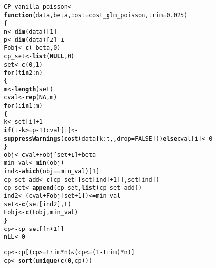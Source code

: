 \documentclass[article]{jss}\usepackage[]{graphicx}\usepackage[]{xcolor}
\makeatletter
\newcommand{\hlnum}[1]{\textcolor[rgb]{0.686,0.059,0.569}{#1}}%
\newcommand{\hlopt}[1]{\textcolor[rgb]{0,0,0}{#1}}%
\newcommand{\hlstd}[1]{\textcolor[rgb]{0.345,0.345,0.345}{#1}}%
\newcommand{\hlkwa}[1]{\textcolor[rgb]{0.161,0.373,0.58}{\textbf{#1}}}%
\newcommand{\hlkwb}[1]{\textcolor[rgb]{0.69,0.353,0.396}{#1}}%
\newcommand{\hlkwc}[1]{\textcolor[rgb]{0.333,0.667,0.333}{#1}}%
\newcommand{\hlkwd}[1]{\textcolor[rgb]{0.737,0.353,0.396}{\textbf{#1}}}%
\newenvironment{kframe}{%
 \def\at@end@of@kframe{}%
 \ifinner\ifhmode%
  \def\at@end@of@kframe{\end{minipage}}%
  \begin{minipage}{\columnwidth}%
 \fi\fi%
 \def\FrameCommand##1{\hskip\@totalleftmargin \hskip-\fboxsep
 \colorbox{shadecolor}{##1}\hskip-\fboxsep
     \hskip-\linewidth \hskip-\@totalleftmargin \hskip\columnwidth}%
 \MakeFramed {\advance\hsize-\width
   \@totalleftmargin\z@ \linewidth\hsize
   \@setminipage}}%
 {\par\unskip\endMakeFramed%
 \at@end@of@kframe}
\newenvironment{knitrout}{}{} %
\makeatother
\begin{document}
\begin{knitrout}
\begin{kframe}
\begin{alltt}
\hlstd{CP_vanilla_poisson} \hlkwb{<-} \hlkwa{function}\hlstd{(}\hlkwc{data}\hlstd{,} \hlkwc{beta}\hlstd{,} \hlkwc{cost}\hlstd{=cost_glm_poisson,} \hlkwc{trim} \hlstd{=} \hlnum{0.025}\hlstd{)}
\hlstd{\{}
\hlstd{n} \hlkwb{<-} \hlkwd{dim}\hlstd{(data)[}\hlnum{1}\hlstd{]}
\hlstd{p} \hlkwb{<-} \hlkwd{dim}\hlstd{(data)[}\hlnum{2}\hlstd{]} \hlopt{-} \hlnum{1}
\hlstd{Fobj} \hlkwb{<-} \hlkwd{c}\hlstd{(}\hlopt{-}\hlstd{beta,} \hlnum{0}\hlstd{)}
\hlstd{cp_set} \hlkwb{<-} \hlkwd{list}\hlstd{(}\hlkwa{NULL}\hlstd{,}\hlnum{0}\hlstd{)}
\hlstd{set} \hlkwb{<-} \hlkwd{c}\hlstd{(}\hlnum{0}\hlstd{,}\hlnum{1}\hlstd{)}
 \hlkwa{for}\hlstd{(t} \hlkwa{in} \hlnum{2}\hlopt{:}\hlstd{n)}
 \hlstd{\{}
 \hlstd{m} \hlkwb{<-} \hlkwd{length}\hlstd{(set)}
 \hlstd{cval} \hlkwb{<-} \hlkwd{rep}\hlstd{(}\hlnum{NA}\hlstd{, m)}
  \hlkwa{for}\hlstd{(i} \hlkwa{in} \hlnum{1}\hlopt{:}\hlstd{m)}
  \hlstd{\{}
  \hlstd{k} \hlkwb{<-} \hlstd{set[i]} \hlopt{+} \hlnum{1}
  \hlkwa{if}\hlstd{(t}\hlopt{-}\hlstd{k}\hlopt{>=}\hlstd{p}\hlopt{-}\hlnum{1}\hlstd{) cval[i]} \hlkwb{<-} \hlkwd{suppressWarnings}\hlstd{(}\hlkwd{cost}\hlstd{(data[k}\hlopt{:}\hlstd{t,,} \hlkwc{drop} \hlstd{=} \hlnum{FALSE}\hlstd{]))} \hlkwa{else} \hlstd{cval[i]} \hlkwb{<-} \hlnum{0}
  \hlstd{\}}
 \hlstd{obj} \hlkwb{<-} \hlstd{cval} \hlopt{+} \hlstd{Fobj[set}\hlopt{+}\hlnum{1}\hlstd{]} \hlopt{+} \hlstd{beta}
 \hlstd{min_val} \hlkwb{<-} \hlkwd{min}\hlstd{(obj)}
 \hlstd{ind} \hlkwb{<-} \hlkwd{which}\hlstd{(obj}\hlopt{==}\hlstd{min_val)[}\hlnum{1}\hlstd{]}
 \hlstd{cp_set_add} \hlkwb{<-} \hlkwd{c}\hlstd{(cp_set[[set[ind]}\hlopt{+}\hlnum{1}\hlstd{]], set[ind])}
 \hlstd{cp_set} \hlkwb{<-} \hlkwd{append}\hlstd{(cp_set,}\hlkwd{list}\hlstd{(cp_set_add))}
 \hlstd{ind2} \hlkwb{<-} \hlstd{(cval} \hlopt{+} \hlstd{Fobj[set}\hlopt{+}\hlnum{1}\hlstd{])} \hlopt{<=} \hlstd{min_val}
 \hlstd{set} \hlkwb{<-} \hlkwd{c}\hlstd{(set[ind2], t)}
 \hlstd{Fobj} \hlkwb{<-} \hlkwd{c}\hlstd{(Fobj, min_val)}
 \hlstd{\}}
\hlstd{cp} \hlkwb{<-} \hlstd{cp_set[[n}\hlopt{+}\hlnum{1}\hlstd{]]}
\hlstd{nLL} \hlkwb{<-} \hlnum{0}

\hlstd{cp} \hlkwb{<-} \hlstd{cp[(cp} \hlopt{>=} \hlstd{trim} \hlopt{*} \hlstd{n)} \hlopt{&} \hlstd{(cp} \hlopt{<=} \hlstd{(}\hlnum{1} \hlopt{-} \hlstd{trim)} \hlopt{*} \hlstd{n)]}
\hlstd{cp} \hlkwb{<-} \hlkwd{sort}\hlstd{(}\hlkwd{unique}\hlstd{(}\hlkwd{c}\hlstd{(}\hlnum{0}\hlstd{, cp)))}


\end{alltt}
\end{kframe}
\end{knitrout}
\end{document}
